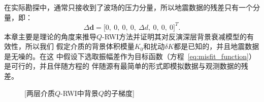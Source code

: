 在实际勘探中，通常只接收到了波场的压力分量，所以地震数据的残差只有一个分量，即：
\begin{equation}
    \Delta\mathbf{d} = \lbrack 0, \ 0, \ 0, \ 0, \ \Delta d, \ 0, \ 0, \ 0\rbrack^T.
\end{equation}
本章主要是理论的角度来推导$Q$-RWI方法并证明其对反演深层背景衰减模型的有效性，所以我们
假定介质的背景体积模量$K_0$和扰动$\delta K$都是已知的，并且地震数据是无噪的。在这
中假设下选取振幅差作为目标函数（方程~\ref{eq:misfit_function}）是可行的，并且伴随方程的
伴随源有最简单的形式即模拟数据与观测数据的残差。

\begin{figure}[!htbp]
    \centering
    [两层介质$Q$-RWI中背景$Q$的子梯度]
    \label{fig:grad_qrwi}
\end{figure}

